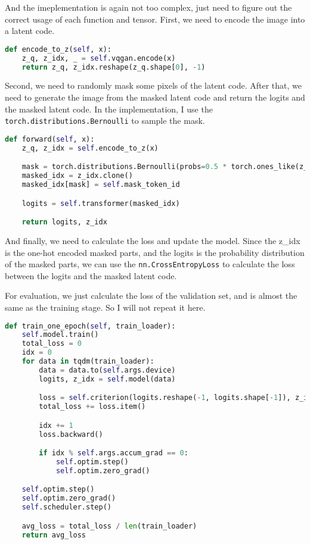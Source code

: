 And the imeplementation is again not too complex, just need to figure out the correct usage of each function and tensor.
First, we need to encode the image into a latent code.

\begin{lstlisting}[language=Python, caption=models/VQGAN\_Transformer.py: encode\_to\_z]
def encode_to_z(self, x):
    z_q, z_idx, _ = self.vqgan.encode(x)
    return z_q, z_idx.reshape(z_q.shape[0], -1)
\end{lstlisting}

Second, we need to randomly mask some pixels of the latent code.
After that, we need to generate the image from the masked latent code and return the logits and the masked latent code.
In the implementation, I use the \texttt{torch.distributions.Bernoulli} to sample the mask.

\begin{lstlisting}[language=Python, caption=models/VQGAN\_Transformer.py: forward]
def forward(self, x):
    z_q, z_idx = self.encode_to_z(x)

    mask = torch.distributions.Bernoulli(probs=0.5 * torch.ones_like(z_idx)).sample().bool()
    masked_idx = z_idx.clone()
    masked_idx[mask] = self.mask_token_id

    logits = self.transformer(masked_idx)

    return logits, z_idx
\end{lstlisting}

And finally, we need to calculate the loss and update the model.
Since the z\_idx is the one-hot encoded masked parts, and the logits is the probability distribution of the masked parts, we can use the \texttt{nn.CrossEntropyLoss} to calculate the loss between the logits and the masked latent code.

For evaluation, we just calculate the loss of the validation set, and is almost the same as the training stage. So I will not repeat it here.

\begin{lstlisting}[language=Python, caption=training\_transformer.py: TrainTransformer.train\_one\_epoch]
def train_one_epoch(self, train_loader):
    self.model.train()
    total_loss = 0
    idx = 0
    for data in tqdm(train_loader):
        data = data.to(self.args.device)
        logits, z_idx = self.model(data)

        loss = self.criterion(logits.reshape(-1, logits.shape[-1]), z_idx.reshape(-1))
        total_loss += loss.item()

        idx += 1
        loss.backward()

        if idx % self.args.accum_grad == 0:
            self.optim.step()
            self.optim.zero_grad()

    self.optim.step()
    self.optim.zero_grad()
    self.scheduler.step()

    avg_loss = total_loss / len(train_loader)
    return avg_loss
\end{lstlisting}

